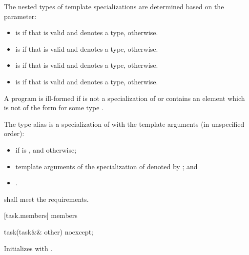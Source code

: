 \pnum
The nested types of  template specializations
are determined based on the  parameter:
\begin{itemize}
\item {} is 
if that  is valid and denotes a type,
 otherwise.
\item {} is 
if that  is valid and denotes a type,
 otherwise.
\item {} is 
if that  is valid and denotes a type,
 otherwise.
\item {} is  if
that  is valid and denotes a type,
 otherwise.
\end{itemize}

\pnum
 A program is ill-formed if  is not a
specialization of  or
 contains an element which is not of the form
 for some type .

\pnum
The type alias  is a specialization
of  with the template
arguments (in unspecified order):
\begin{itemize}
\item {} if  is ,
and  otherwise;
\item template arguments of the specialization of
 denoted by ;
and
\item {}.
\end{itemize}

\pnum
{} shall meet the 
requirements.

[task.members]{ members}

%
\begin{itemdecl}
task(task&& other) noexcept;
\end{itemdecl}
\begin{itemdescr}
\pnum
\effects
Initializes  with .
\end{itemdescr}

